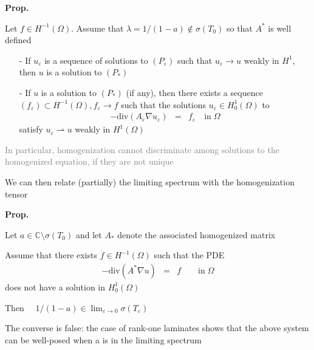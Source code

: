 \documentclass[mathserif,9pt]{beamer}
\def\e{{\varepsilon}}
\begin{document}
\begin{frame}
\small{

\textcolor{ox}{\bf Prop.}
\medskip

Let $f \in H^{-1}(\Omega)$. Assume that 
$\lambda = 1/(1-a) \notin \sigma(T_0)$ so that $A^*$ is well defined
\medskip

\begin{itemize}
\item[-] 
If $u_\e$ is a sequence of solutions to $(P_\e)$
such that \textcolor{ox}{$u_\e \to u$} weakly in $H^1$, then 
$u$ is a solution to $(P_*)$
\medskip

\item[-]
If $u$ is a solution to $(P_*)$ (if any), then there exists a sequence
$(f_\e) \subset H^{-1}(\Omega), f_\e \to f$ such that 
the solutions $u_\e \in H^1_0(\Omega)$ to
\textcolor{ox}{
\begin{eqnarray*}
- \textrm{div}(A_\e \nabla u_\e) &=& f_\e \quad \textrm{in}\; \Omega
\end{eqnarray*}}
satisfy \textcolor{ox}{$u_\e \rightharpoonup u$ weakly in $H^1(\Omega)$}
\end{itemize}
\bigskip

\textcolor{gray}{In particular, homogenization cannot discriminate
among solutions to the homogenized equation, if they are not unique}

}
\end{frame}
\begin{frame}
\small{

We can then relate (partially) the limiting spectrum with 
the homogenization tensor
\bigskip

\textcolor{ox}{\bf Prop.}
\medskip

Let $a \in {\mathbb C} \setminus \sigma(T_0)$ and let $A_*$ denote the
associated homogenized matrix
\medskip

Assume that there exists $f \in H^{-1}(\Omega)$ such that the PDE
\textcolor{ox}{
\begin{eqnarray*}
- \textrm{div}(A^* \nabla u) &=& f \quad\quad \textrm{in}\; \Omega
\end{eqnarray*}}
does not have a solution in $H^1_0(\Omega)$
\medskip

Then \textcolor{ox}{$\quad 1/(1-a) \in \lim_{\e \to 0} \sigma(T_\e)$}
\bigskip

\textcolor{b_bruz}{The converse is false: the case of rank-one laminates
shows that the above system can be well-posed when a is in
the limiting spectrum}

}
\end{frame}
\end{document}
